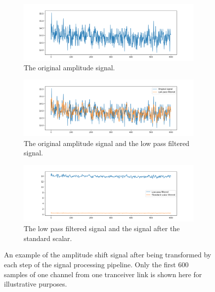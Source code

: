 \begin{figure}
	\centering
	\begin{subfigure}{0.49\textwidth}
		\centering
		\includegraphics[width=\textwidth]{figures/amp_original}
		\caption{The original amplitude signal.}
	\end{subfigure}
	\hfill
	\begin{subfigure}{0.49\textwidth}
		\centering
		\includegraphics[width=\textwidth]{figures/amp_step_1}
		\caption{The original amplitude signal and the low pass filtered signal.}
	\end{subfigure}
	\hfill
	\begin{subfigure}{0.49\textwidth}
		\centering
		\includegraphics[width=\textwidth]{figures/amp_step_2}
		\caption{The low pass filtered signal and the signal after the standard scalar.}
	\end{subfigure}
	\hfill
	\caption{An example of the amplitude shift signal after being transformed by each step of the signal processing pipeline. Only the first 600 samples of one channel from one tranceiver link is shown here for illustrative purposes.} \label{fig:amp-pipeline}
\end{figure}

